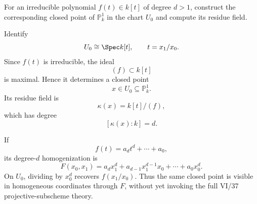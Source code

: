\begin{problem}\label{prob:vi36-05}
For an irreducible polynomial \(f(t)\in k[t]\) of degree \(d>1\), construct the corresponding closed point of \(\mathbb P^1_k\) in the chart \(U_0\) and compute its residue field.
\end{problem}

\ifdefined\FullProblemDossiers
\begin{solution}
Identify
\[
U_0\cong\Spec k[t],
\qquad
t=x_1/x_0.
\]
Since \(f(t)\) is irreducible, the ideal
\[
(f)\subset k[t]
\]
is maximal. Hence it determines a closed point
\[
x\in U_0\subseteq\mathbb P^1_k.
\]
Its residue field is
\[
\boxed{
\kappa(x)=k[t]/(f),
}
\]
which has degree
\[
[\kappa(x):k]=d.
\]

If
\[
f(t)=a_dt^d+\cdots+a_0,
\]
its degree-\(d\) homogenization is
\[
F(x_0,x_1)
=
a_dx_1^d+a_{d-1}x_1^{d-1}x_0+\cdots+a_0x_0^d.
\]
On \(U_0\), dividing by \(x_0^d\) recovers \(f(x_1/x_0)\). Thus the same closed point is visible in homogeneous
coordinates through \(F\), without yet invoking the full VI/37 projective-subscheme theory.
\end{solution}
\fi
